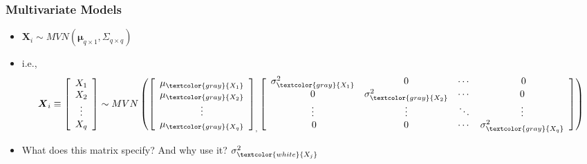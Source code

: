 \documentclass[xcolor={dvipsnames}]{beamer}
\begin{document}
\frame
{
 \frametitle{Multivariate Models}
\begin{itemize}
\item 
${\boldsymbol X}_i   \sim MVN({\boldsymbol \mu}_{q\times1},\Sigma_{q \times q})$ 
\item[] i.e.,
$${\boldsymbol X}_i \equiv  \left[\begin{array}{c} X_1 \\ X_2 \\ \vdots\\ X_q \end{array} \right] \sim MVN\left(
 \left[\begin{array}{c} \mu_{\textcolor{gray}{X_1}} \\ \mu_{\textcolor{gray}{X_2}} \\ \vdots\\ \mu_{\textcolor{gray}{X_q}} \end{array} \right]_,
\left[\begin{array}{cccc}\sigma^2_{\textcolor{gray}{X_1}}&\;\;\;0\;\;\;& \cdots & \;\;\;\;0\;\;\;\\ 
0&\sigma^2_{\textcolor{gray}{X_2}}&  \cdots & 0\\
\vdots &\vdots&  \ddots & \vdots\\
\;\;\;\;0\;\;\; & 0 &   \cdots & \sigma^2_{\textcolor{gray}{X_q}}  \\ \end{array}\right]\right)$$
\item<1-> What does this matrix specify? And why use it? \textcolor{white}{$\sigma^2_{\textcolor{white}{X_j}}$}

\end{itemize}
}
\end{document}
